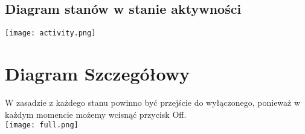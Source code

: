 \documentclass[13pt]{article}
\begin{document}
\subsection{Diagram stanów w stanie aktywności}
\hspace*{-2.0cm}                                                           
\texttt{[image: activity.png]}
\section{Diagram Szczegółowy}
W zasadzie z każdego stanu powinno być przejście do wyłączonego, ponieważ w każdym momencie możemy wcisnąć przycisk Off.\\
\hspace*{-2.0cm}    
\texttt{[image: full.png]}
\end{document}

